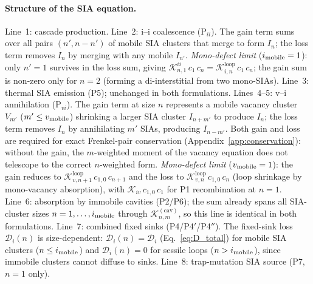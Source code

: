 \documentclass[pdflatex,sn-basic]{sn-jnl} %
\begin{document}
\paragraph{Structure of the SIA equation.}
Line~1: cascade production.
Line~2: i--i coalescence (P$_{ii}$). The gain term sums over all pairs
$(n', n{-}n')$ of mobile SIA clusters that merge to form $I_n$; the loss
term removes $I_n$ by merging with any mobile $I_{n'}$.
\emph{Mono-defect limit} ($i_{\rm mobile} = 1$): only $n'=1$ survives in
the loss sum, giving $\mathcal{K}_{n,1}^{ii}\,c_1\,c_n =
\mathcal{K}_{i,n}^{\mathrm{loop}}\,c_1\,c_n$; the gain sum is
non-zero only for $n = 2$ (forming a di-interstitial from two
mono-SIAs).
Line~3: thermal SIA emission (P5); unchanged in both formulations.
Lines~4--5: v--i annihilation (P$_{vi}$). The gain term at size $n$
represents a mobile vacancy cluster $V_{m'}$ ($m' \leq v_{\rm mobile}$)
shrinking a larger SIA cluster $I_{n+m'}$ to produce $I_n$; the loss
term removes $I_n$ by annihilating $m'$ SIAs, producing $I_{n-m'}$.
Both gain and loss are required for exact Frenkel-pair conservation
(Appendix~\ref{app:conservation}): without the gain, the $m$-weighted
moment of the vacancy equation does not telescope to the correct $n$-weighted
form.
\emph{Mono-defect limit} ($v_{\rm mobile} = 1$): the gain reduces to
$\mathcal{K}_{v,n+1}^{\mathrm{loop}}\,c_{1,0}\,c_{n+1}$ and the loss to
$\mathcal{K}_{v,n}^{\mathrm{loop}}\,c_{1,0}\,c_n$ (loop shrinkage by
mono-vacancy absorption), with $\mathcal{K}_{iv}\,c_{1,0}\,c_1$ for P1
recombination at $n=1$.
Line~6: absorption by immobile cavities (P2/P6); the sum already spans
all SIA-cluster sizes $n = 1,\ldots,i_{\rm mobile}$ through
$\mathcal{K}_{n,m}^{(\mathrm{cav})}$, so this line is identical in both
formulations.
Line~7: combined fixed sinks (P4/P4$'$/P4$''$).  The fixed-sink loss
$\mathcal{D}_i(n)$ is size-dependent: $\mathcal{D}_i(n) = \mathcal{D}_i$
(Eq.~\ref{eq:D_total}) for mobile SIA clusters ($n \leq i_{\rm mobile}$) and
$\mathcal{D}_i(n) = 0$ for sessile loops ($n > i_{\rm mobile}$), since immobile
clusters cannot diffuse to sinks.
Line~8: trap-mutation SIA source (P7, $n=1$ only).
\end{document}

